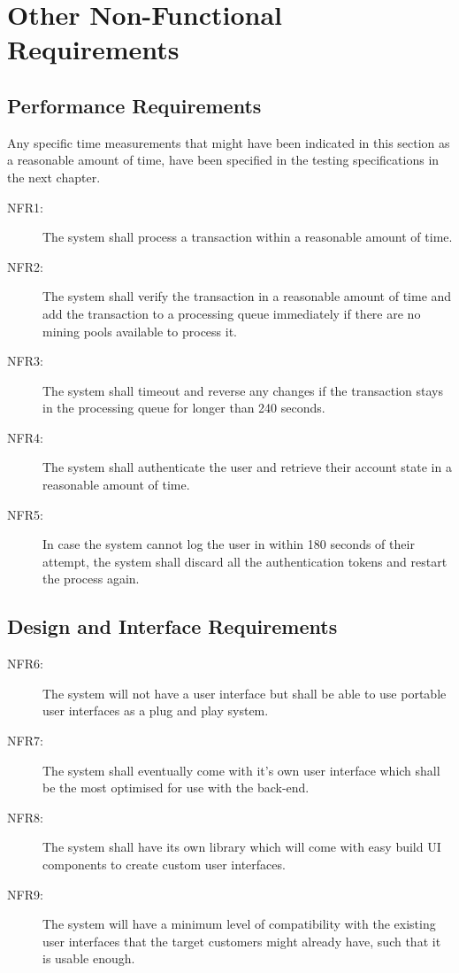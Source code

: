\documentclass[a4paper,twoside,phd]{BYUPhys}
\begin{document}
\section{Other Non-Functional Requirements}
\subsection{Performance Requirements}
Any specific time measurements that might have been indicated in this section as a reasonable amount of time, have been specified in the testing specifications in the next chapter.
\begin{description}
\item[NFR1:] The system shall process a transaction within a reasonable amount of time.
\item[NFR2:] The system shall verify the transaction in a reasonable amount of time and add the transaction to a processing queue immediately if there are no mining pools available to process it.
\item[NFR3:] The system shall timeout and reverse any changes if the transaction stays in the processing queue for longer than 240 seconds.
\item[NFR4:] The system shall authenticate the user and retrieve their account state in a reasonable amount of time.
\item[NFR5:] In case the system cannot log the user in within 180 seconds of their attempt, the system shall discard all the authentication tokens and restart the process again.
\end{description}
\subsection{Design and Interface Requirements}
\begin{description}
\item[NFR6:] The system will not have a user interface but shall be able to use portable user interfaces as a plug and play system. 
\item[NFR7:] The system shall eventually come with it's own user interface which shall be the most optimised for use with the back-end.
\item[NFR8:] The system shall have its own library which will come with easy build UI components to create custom user interfaces.
\item[NFR9:] The system will have a minimum level of compatibility with the existing user interfaces that the target customers might already have, such that it is usable enough.
\end{description}
\end{document}
